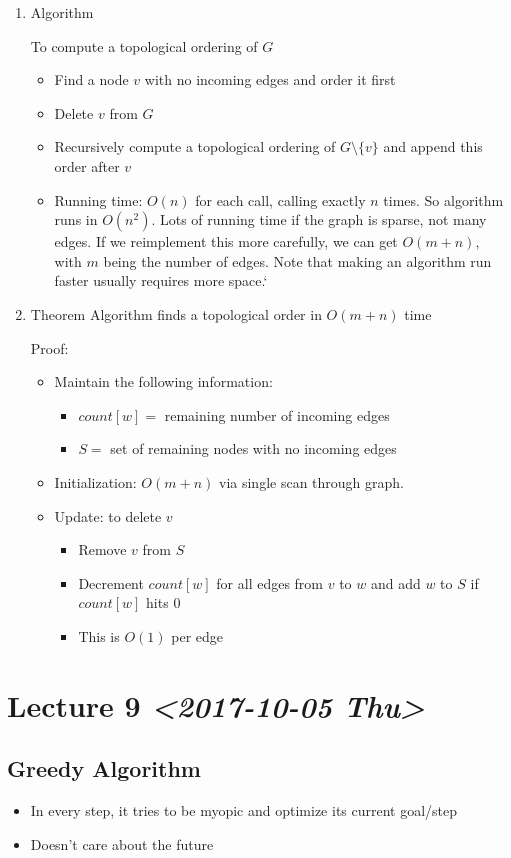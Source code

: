 \documentclass[11pt]{article}
\begin{document}
\begin{enumerate}
\item Algorithm
\label{sec:orgb153977}

To compute a topological ordering of \(G\)
\begin{itemize}
\item Find a node \(v\) with no incoming edges and order it first
\item Delete \(v\) from \(G\)
\item Recursively compute a topological ordering of \(G\setminus \{v\}\) and append this order after \(v\)
\item Running time: \(O(n)\) for each call, calling exactly \(n\) times. So algorithm runs in \(O(n^2)\). Lots of running time if the graph is sparse, not many edges. If we reimplement this more carefully, we can get \(O(m+n)\), with \(m\) being the number of edges. Note that making an algorithm run faster usually requires more space.`
\end{itemize}
\item Theorem
\label{sec:orgd496692}
Algorithm finds a topological order in \(O(m+n)\) time

Proof:
\begin{itemize}
\item Maintain the following information:
\begin{itemize}
\item \(count[w] =\) remaining number of incoming edges
\item \(S=\) set of remaining nodes with no incoming edges
\end{itemize}
\item Initialization: \(O(m+n)\) via single scan through graph.
\item Update: to delete \(v\)
\begin{itemize}
\item Remove \(v\) from \(S\)
\item Decrement \(count[w]\) for all edges from \(v\) to \(w\) and add \(w\) to \(S\) if \(count[w]\) hits \(0\)
\item This is \(O(1)\) per edge
\end{itemize}
\end{itemize}
\end{enumerate}
\section{Lecture 9 \textit{<2017-10-05 Thu>}}
\label{sec:orgc4acd4b}
\subsection{Greedy Algorithm}
\label{sec:org636fe51}
\begin{itemize}
\item In every step, it tries to be myopic and optimize its current goal/step
\item Doesn't care about the future
\end{itemize}
\end{document}
